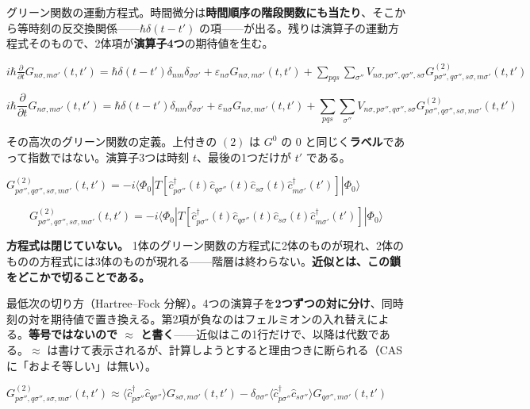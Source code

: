 \documentclass[dvipdfmx,a4paper,11pt]{jsarticle}
\begin{document}
グリーン関数の運動方程式。時間微分は\textbf{時間順序の階段関数にも当たり}、そこから等時刻の反交換関係——$\hbar\delta(t-t')$ の項——が出る。残りは演算子の運動方程式そのもので、2体項が\textbf{演算子4つ}の期待値を生む。

$i\hbar \frac{\partial}{\partial t} G_{n\sigma,m\sigma'}(t,t') = \hbar\delta(t-t')\delta_{nm}\delta_{\sigma\sigma'} + \varepsilon_{n\sigma} G_{n\sigma,m\sigma'}(t,t') + \sum_{p q s}\sum_{\sigma''} V_{n\sigma,p\sigma'',q\sigma'',s\sigma} G^{(2)}_{p\sigma'',q\sigma'',s\sigma,m\sigma'}(t,t')$

\begin{equation}
  i\hbar \frac{\partial}{\partial t} G_{n\sigma,m\sigma'}(t,t') = \hbar\delta(t-t')\delta_{nm}\delta_{\sigma\sigma'} + \varepsilon_{n\sigma} G_{n\sigma,m\sigma'}(t,t') + \sum_{p q s}\sum_{\sigma''} V_{n\sigma,p\sigma'',q\sigma'',s\sigma} G^{(2)}_{p\sigma'',q\sigma'',s\sigma,m\sigma'}(t,t')
  \label{eq:E24}
\end{equation}

その高次のグリーン関数の定義。上付きの $(2)$ は $G^0$ の $0$ と同じく\textbf{ラベル}であって指数ではない。演算子3つは時刻 $t$、最後の1つだけが $t'$ である。

$G^{(2)}_{p\sigma'',q\sigma'',s\sigma,m\sigma'}(t,t') = -i\langle\Phi_0| T[\hat c^\dagger_{p\sigma''}(t) \hat c_{q\sigma''}(t) \hat c_{s\sigma}(t) \hat c^\dagger_{m\sigma'}(t')]|\Phi_0\rangle$

\begin{equation}
  G^{(2)}_{p\sigma'',q\sigma'',s\sigma,m\sigma'}(t,t') = -i\langle\Phi_0| T[\hat c^\dagger_{p\sigma''}(t) \hat c_{q\sigma''}(t) \hat c_{s\sigma}(t) \hat c^\dagger_{m\sigma'}(t')]|\Phi_0\rangle
  \label{eq:E25}
\end{equation}

\textbf{方程式は閉じていない。} 1体のグリーン関数の方程式に2体のものが現れ、2体のものの方程式には3体のものが現れる——階層は終わらない。\textbf{近似とは、この鎖をどこかで切ることである。}

最低次の切り方（Hartree–Fock 分解）。4つの演算子を\textbf{2つずつの対に分け}、同時刻の対を期待値で置き換える。第2項が負なのはフェルミオンの入れ替えによる。\textbf{等号ではないので $\approx$ と書く}——近似はこの1行だけで、以降は代数である。$\approx$ は書けて表示されるが、計算しようとすると理由つきに断られる（CAS に「およそ等しい」は無い）。

$G^{(2)}_{p\sigma'',q\sigma'',s\sigma,m\sigma'}(t,t') \approx \langle \hat c^\dagger_{p\sigma''} \hat c_{q\sigma''}\rangle G_{s\sigma,m\sigma'}(t,t') - \delta_{\sigma\sigma''} \langle \hat c^\dagger_{p\sigma''} \hat c_{s\sigma''}\rangle G_{q\sigma'',m\sigma'}(t,t')$
\end{document}
